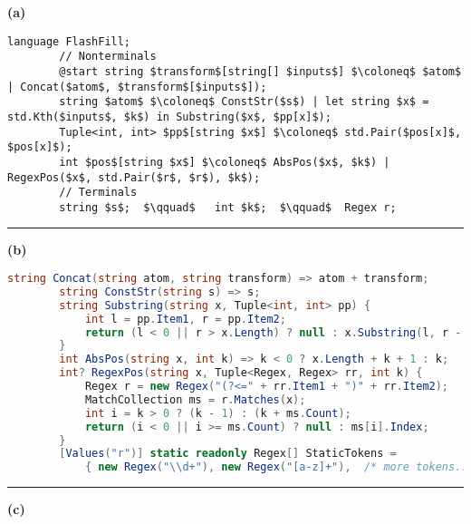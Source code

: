 \begin{figure*}
    \centering
    \lstset{basicstyle = \footnotesize\ttfamily}
    \def\baselinestretch{1.05}
    \hfill\textbf{(a)}
    \vspace{-0.8\baselineskip}
    \begin{lstlisting}[language=dsl,gobble=8,morekeywords={Regex}]
        language FlashFill;
        // Nonterminals
        @start string $transform$[string[] $inputs$] $\coloneq$ $atom$ | Concat($atom$, $transform$[$inputs$]);
        string $atom$ $\coloneq$ ConstStr($s$) | let string $x$ = std.Kth($inputs$, $k$) in Substring($x$, $pp[x]$);
        Tuple<int, int> $pp$[string $x$] $\coloneq$ std.Pair($pos[x]$, $pos[x]$);
        int $pos$[string $x$] $\coloneq$ AbsPos($x$, $k$) | RegexPos($x$, std.Pair($r$, $r$), $k$);
        // Terminals
        string $s$;  $\qquad$   int $k$;  $\qquad$  Regex r;
    \end{lstlisting}
    \hrule
    \vspace{5pt}
    \hfill\textbf{(b)}
    \vspace{-0.9\baselineskip}
    \begin{lstlisting}[language=csharp,gobble=8,breaklines=false,morekeywords={Tuple}]
        string Concat(string atom, string transform) => atom + transform;
        string ConstStr(string s) => s;
        string Substring(string x, Tuple<int, int> pp) {
            int l = pp.Item1, r = pp.Item2;
            return (l < 0 || r > x.Length) ? null : x.Substring(l, r - l);
        }
        int AbsPos(string x, int k) => k < 0 ? x.Length + k + 1 : k;
        int? RegexPos(string x, Tuple<Regex, Regex> rr, int k) {
            Regex r = new Regex("(?<=" + rr.Item1 + ")" + rr.Item2);
            MatchCollection ms = r.Matches(x);
            int i = k > 0 ? (k - 1) : (k + ms.Count);
            return (i < 0 || i >= ms.Count) ? null : ms[i].Index;
        }
        [Values("r")] static readonly Regex[] StaticTokens =
            { new Regex("\\d+"), new Regex("[a-z]+"),  /* more tokens... */ }
    \end{lstlisting}
    \hrule
    \vspace{5pt}
    \hfill\textbf{(c)}
    \vspace{-0.9\baselineskip}

\end{figure*}
